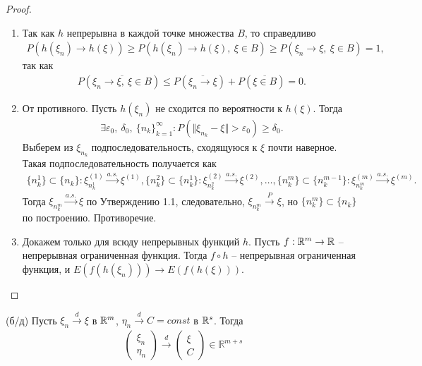 \begin{proof} ~
	\begin{enumerate}
		\item Так как $h$ непрерывна в каждой точке множества $B$, то справедливо 
		\begin{gather*}
		    P\left(h\left(\xi_n\right) \rightarrow h\left(\xi\right)\right) \ge P\left(h\left(\xi_n\right) \rightarrow h\left(\xi\right),\ \xi \in B\right) \ge P\left(\xi_n \rightarrow \xi,\ \xi \in B\right) = 1,
		\end{gather*}
		так как
		\begin{gather*}
		    P\left(\overline{\xi_n \rightarrow \xi,\ \xi \in B}\right) \le P\left(\overline{\xi_n \rightarrow \xi}\right) + P\left(\overline{\xi \in B}\right) = 0.
		\end{gather*}
		
		\item От противного. Пусть $h\left(\xi_n\right)$ не сходится по вероятности к $h\left(\xi\right)$. Тогда
		\begin{gather*}
		    \exists \varepsilon_0,\ \delta_0,\ \{n_k\}_{k=1}^\infty : P(\Vert\xi_{n_k} - \xi\Vert > \varepsilon_0) \ge \delta_0.
		\end{gather*}
		Выберем из $\xi_{n_k}$ подпоследовательность, сходящуюся к $\xi$ почти наверное. Такая подпоследовательность получается как
		\begin{gather*}
		    \{n_k^1\} \subset \{n_k\}: \xi^{(1)}_{n_k^1} \xrightarrow{a.s.} \xi^{(1)}, \{n_k^2\} \subset \{n_k^1\}: \xi^{(2)}_{n_k^2}\xrightarrow{a.s.} \xi^{(2)},\ldots, \{n_k^m\} \subset \{n_k^{m-1}\}: \xi^{(m)}_{n_k^m}\xrightarrow{a.s.} \xi^{(m)}.
		\end{gather*}
		Тогда $\xi_{n_k^m} \xrightarrow{a.s.} \xi$ по Утверждению 1.1, следовательно, $\xi_{n_k^m} \xrightarrow{P} \xi$, но $\{n_k^m\} \subset \{n_k\}$ по построению. Противоречие.
		
		\item Докажем только для всюду непрерывных функций $h$. Пусть $f:\mathbb{R}^m\rightarrow\mathbb{R}$ -- непрерывная ограниченная функция. Тогда $f \circ h$ -- непрерывная ограниченная функция, и $E\left(f\left(h\left(\xi_n\right)\right)\right) \rightarrow E\left(f \left( h\left( \xi\right) \right) \right).$
	\end{enumerate}
\end{proof}

\begin{proposition}
	(б/д) Пусть $\xi_n \xrightarrow{d} \xi$ в $\mathbb{R}^m$, $\eta_n \xrightarrow{d} C = const$ в $\mathbb{R}^s$. Тогда
	\begin{gather*}
	    \begin{pmatrix}
		\xi _{n}\\
		\eta _{n}
    	\end{pmatrix}\xrightarrow{d}
    	\begin{pmatrix}
    		\xi \\
    		C
    	\end{pmatrix} \in \mathbb{R}^{m+s}
	\end{gather*}
\end{proposition}

